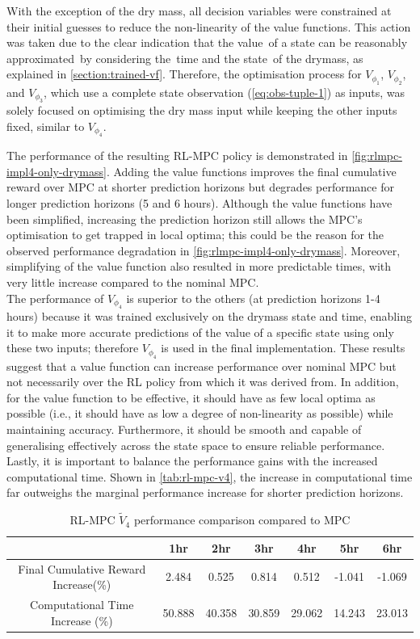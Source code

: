 With the exception of the dry mass, all decision variables were constrained at their initial guesses to reduce the non-linearity of the value functions. This action was taken due to the clear indication that the value of a state can be reasonably approximated by considering the time and the state of the drymass, as explained in \autoref{section:trained-vf}. Therefore, the optimisation process for ${V}_{\phi_1}$, ${V}_{\phi_2}$, and ${V}_{\phi_3}$, which use a complete state observation (\autoref{eq:obs-tuple-1}) as inputs, was solely focused on optimising the dry mass input while keeping the other inputs fixed, similar to ${V}_{\phi_4}$.

The performance of the resulting RL-MPC policy is demonstrated in \autoref{fig:rlmpc-impl4-only-drymass}. Adding the value functions improves the final cumulative reward over MPC at shorter prediction horizons but degrades performance for longer prediction horizons (5 and 6 hours). Although the value functions have been simplified, increasing the prediction horizon still allows the MPC's optimisation to get trapped in local optima; this could be the reason for the observed performance degradation in \autoref{fig:rlmpc-impl4-only-drymass}. Moreover, simplifying of the value function also resulted in more predictable times, with very little increase compared to the nominal MPC.\\

The performance of ${V}_{\phi_4}$ is superior to the others (at prediction horizons 1-4 hours) because it was trained exclusively on the drymass state and time, enabling it to make more accurate predictions of the value of a specific state using only these two inputs; therefore ${V}_{\phi_4}$ is used in the final implementation. These results suggest that a value function can increase performance over nominal MPC but not necessarily over the RL policy from which it was derived from. In addition, for the value function to be effective, it should have as few local optima as possible (i.e., it should have as low a degree of non-linearity as possible) while maintaining accuracy. Furthermore, it should be smooth and capable of generalising effectively across the state space to ensure reliable performance. Lastly, it is important to balance the performance gains with the increased computational time. Shown in \autoref{tab:rl-mpc-v4}, the increase in computational time far outweighs the marginal performance increase for shorter prediction horizons.

\begin{table}[H]
	\centering
	\begin{tabular}{|c|cccccc|}
		\hline
		&1hr&2hr&3hr&4hr&5hr&6hr\\
		\hline
		Final Cumulative Reward Increase(\%) &2.484 &0.525&0.814&0.512&-1.041& -1.069\\
		\hline
		Computational Time Increase     (\%) &50.888 &40.358&30.859&29.062&14.243& 23.013\\
		\hline
	\end{tabular}
	\caption{RL-MPC $\tilde{V}_4$ performance comparison compared to MPC}
	\label{tab:rl-mpc-v4}
\end{table}



